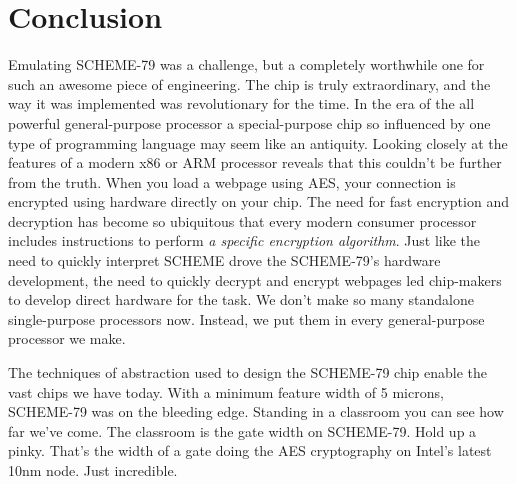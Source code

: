 \documentclass[12pt]{article}
\begin{document}
\section{Conclusion}
Emulating SCHEME-79 was a challenge, but a completely worthwhile one
for such an awesome piece of engineering.  The chip is truly
extraordinary, and the way it was implemented was revolutionary for
the time.  In the era of the all powerful general-purpose processor a
special-purpose chip so influenced by one type of programming language
may seem like an antiquity.  Looking closely at the features of a
modern x86 or ARM processor reveals that this couldn't be further from
the truth.  When you load a webpage using AES, your connection is
encrypted using hardware directly on your chip.  The need for fast
encryption and decryption has become so ubiquitous that every modern
consumer processor includes instructions to perform \textit{a specific
  encryption algorithm}.  Just like the need to quickly interpret
SCHEME drove the SCHEME-79's hardware development, the need to quickly
decrypt and encrypt webpages led chip-makers to develop direct
hardware for the task.  We don't make so many standalone
single-purpose processors now. Instead, we put them in every
general-purpose processor we make.\par
The techniques of abstraction used to design the SCHEME-79 chip enable
the vast chips we have today.  With a minimum feature width of 5
microns\cite[21]{s79}, SCHEME-79 was on the bleeding edge.  Standing
in a classroom you can see how far we've come.  The classroom is the
gate width on SCHEME-79.  Hold up a pinky.  That's the width of a
gate doing the AES cryptography on Intel's latest 10nm
node\cite{wiki}.  Just incredible.

\pagebreak


\pagebreak
\end{document}

